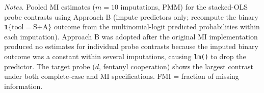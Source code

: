 \documentclass[12pt,letterpaper]{article}
\begin{document}
\begin{table}[htbp]
\centering
\small
\caption{Multiple Imputation Robustness: Eight-Probe Specificity Contrasts}
\label{tab:app_mi_phase5}

\par\vspace{0.5ex}
{\footnotesize\textit{Notes.} Pooled MI estimates ($m = 10$ imputations, PMM) for the stacked-OLS probe contrasts using Approach B (impute predictors only; recompute the binary $\mathbf{1}\{\text{tool} = \text{S+A}\}$ outcome from the multinomial-logit predicted probabilities within each imputation). Approach B was adopted after the original MI implementation produced no estimates for individual probe contrasts because the imputed binary outcome was a constant within several imputations, causing \texttt{lm()} to drop the predictor. The target probe ($d$, fentanyl cooperation) shows the largest contrast under both complete-case and MI specifications. FMI = fraction of missing information.}
\end{table}
\end{document}
